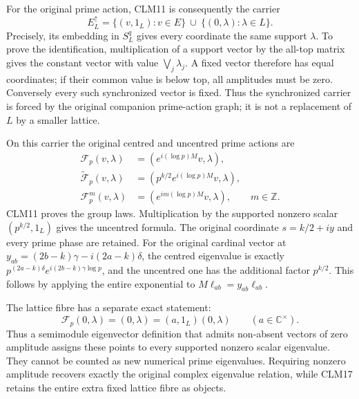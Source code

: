 \documentclass[11pt]{article}
\begin{document}
For the original prime action, CLM11 is consequently the carrier
\begin{equation}\tag{CLM15}
E^\uparrow_L=
 \{(v,1_L):v\in E\}\ \cup\ \{(0,\lambda):\lambda\in L\}.
\end{equation}
Precisely, its embedding in $S_L^q$ gives every coordinate the same
support $\lambda$. To prove the identification, multiplication of a
support vector by the all-top matrix gives the constant vector with
value $\bigvee_j\lambda_j$. A fixed vector therefore has equal
coordinates; if their common value is below top, all amplitudes must
be zero. Conversely every such synchronized vector is fixed. Thus the
synchronized carrier is forced by the original companion prime-action
graph; it is not a replacement of $L$ by a smaller lattice.

On this carrier the original centred and uncentred prime actions are
\begin{equation}\tag{CLM16}
\begin{aligned}
\mathcal F_p(v,\lambda)
 &=(e^{i(\log p)M}v,\lambda),\\
\widetilde{\mathcal F}_p(v,\lambda)
 &=(p^{k/2}e^{i(\log p)M}v,\lambda),\\
\mathcal F_p^m(v,\lambda)
 &=(e^{im(\log p)M}v,\lambda),\qquad m\in\mathbb Z.
\end{aligned}
\end{equation}
CLM11 proves the group laws. Multiplication by the supported nonzero
scalar $(p^{k/2},1_L)$ gives the uncentred formula. The original
coordinate $s=k/2+iy$ and every prime phase are retained.
For the original cardinal vector at
$y_{ab}=(2b-k)\gamma-i(2a-k)\delta$, the centred eigenvalue is exactly
$p^{(2a-k)\delta}e^{i(2b-k)\gamma\log p}$, and the uncentred one has
the additional factor $p^{k/2}$. This follows by applying the entire
exponential to $M\ell_{ab}=y_{ab}\ell_{ab}$.

The lattice fibre has a separate exact statement:
\begin{equation}\tag{CLM17}
\mathcal F_p(0,\lambda)=(0,\lambda)
 =(a,1_L)(0,\lambda)\qquad(a\in\mathbb C^\times).
\end{equation}
Thus a semimodule eigenvector definition that admits non-absent vectors
of zero amplitude assigns these points to every supported nonzero
scalar eigenvalue. They cannot be counted as new numerical prime
eigenvalues. Requiring nonzero amplitude recovers exactly the original
complex eigenvalue relation, while CLM17 retains the entire extra
fixed lattice fibre as objects.
\end{document}
